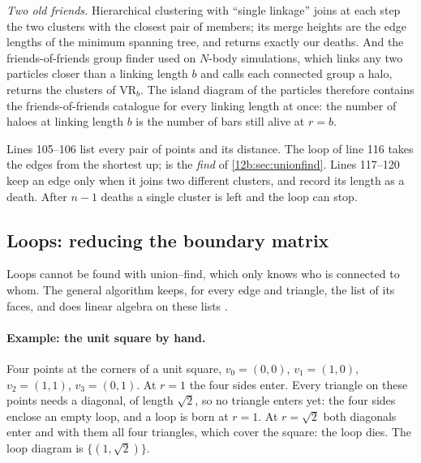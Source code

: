 \emph{Two old friends.} Hierarchical clustering with ``single linkage'' joins at each step the two clusters with the
closest pair of members; its merge heights are the edge lengths of the minimum spanning tree, and
 returns exactly our deaths. And the friends-of-friends
group finder used on $N$-body simulations, which links any two particles closer than a linking length $b$ and calls
each connected group a halo, returns the clusters of $\mathrm{VR}_b$. The island diagram of the particles therefore
contains the friends-of-friends catalogue for every linking length at once: the number of haloes at linking length
$b$ is the number of bars still alive at $r=b$.


\noindent Lines 105--106 list every pair of points and its distance. The loop of line 116 takes the edges from the
shortest up;  is the \emph{find} of \cref{12b:sec:unionfind}. Lines 117--120 keep an edge only when it
joins two different clusters, and record its length as a death. After $n-1$ deaths a single cluster is left and the
loop can stop.

\subsection{Loops: reducing the boundary matrix}
\label{12b:sec:reduction}

Loops cannot be found with union--find, which only knows who is connected to whom. The general algorithm keeps,
for every edge and triangle, the list of its faces, and does linear algebra on these lists
\cite{Edelsbrunner2002,Pranav2017}.

\paragraph{Example: the unit square by hand.} Four points at the corners of a unit square, $v_0=(0,0)$,
$v_1=(1,0)$, $v_2=(1,1)$, $v_3=(0,1)$. At $r=1$ the four sides enter. Every triangle on these points needs a
diagonal, of length $\sqrt2$, so no triangle enters yet: the four sides enclose an empty loop, and a loop is born at
$r=1$. At $r=\sqrt2$ both diagonals enter and with them all four triangles, which cover the square: the loop dies.
The loop diagram is $\{(1,\sqrt2)\}$.

